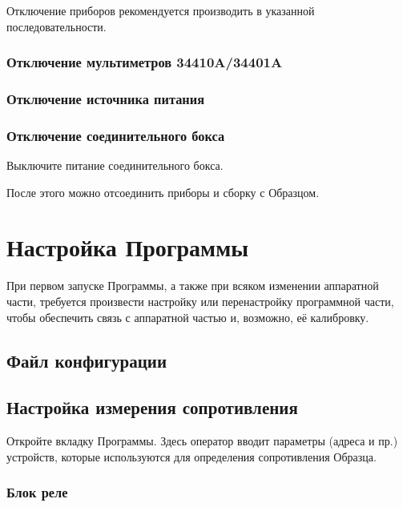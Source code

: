 \documentclass[12pt, a4paper, twocolumn]{report}
\begin{document}
Отключение приборов рекомендуется производить в указанной последовательности.

\subsection{Отключение мультиметров 34410A/34401A}



\subsection{Отключение источника питания}



\subsection{Отключение соединительного бокса}

Выключите питание соединительного бокса.

\bigskip

После этого можно отсоединить приборы и сборку с Образцом.

\chapter{Настройка Программы}

При первом запуске Программы, а также при всяком изменении аппаратной части, требуется произвести настройку или перенастройку программной части, чтобы обеспечить связь с аппаратной частью и, возможно, её калибровку.

\section{Файл конфигурации}



\section{Настройка измерения сопротивления}

Откройте вкладку  Программы. Здесь оператор вводит параметры (адреса и пр.) устройств, которые используются для определения сопротивления Образца.

\subsection{Блок реле}
\end{document}
